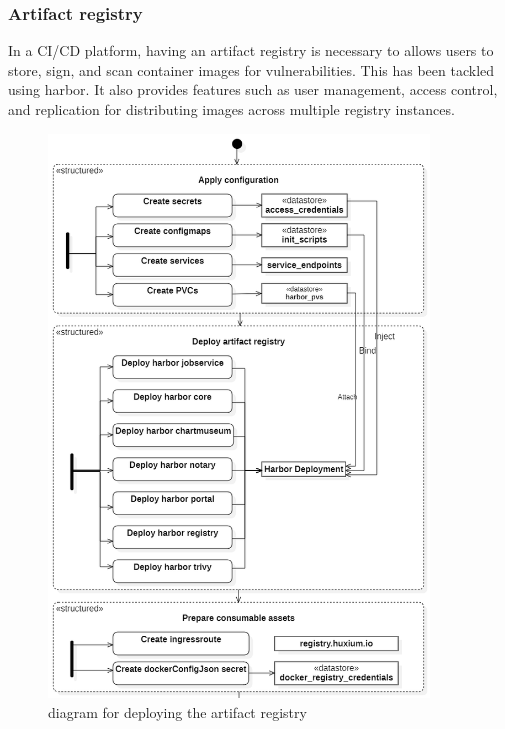 \subsubsection{Artifact registry }

In a CI/CD platform, having an artifact registry is necessary to allows users to store, sign, and scan container images for vulnerabilities. This has been tackled using harbor. It also provides features such as user management, access control, and replication for distributing images across multiple registry instances. 


\begin{figure}[H]\centering
\includegraphics[width=0.9\textwidth,angle=00]{assets/f39.png}
\caption{diagram for deploying the artifact registry }
\label{fig:diagram for deploying the artifact registry}
\end{figure}

